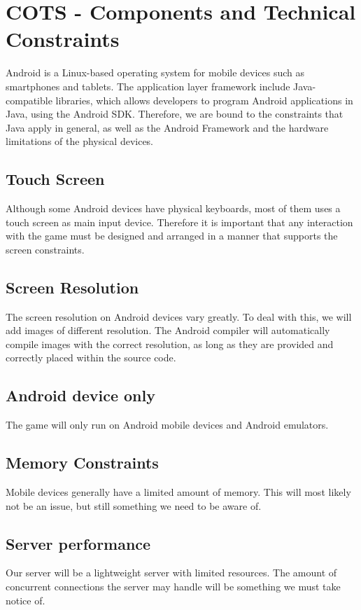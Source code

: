 \section{COTS - Components and Technical Constraints}
\label{sec:COTS}

Android is a Linux-based operating system for mobile devices such as smartphones and tablets. The application layer framework include Java-compatible libraries, which allows developers to program Android applications in Java, using the Android SDK. Therefore, we are bound to the constraints that Java apply in general, as well as the Android Framework and the hardware limitations of the physical devices.

\subsection{Touch Screen}
Although some Android devices have physical keyboards, most of them uses a touch screen as main input device. Therefore it is important that any interaction with the game must be designed and arranged in a manner that supports the screen constraints. 

\subsection{Screen Resolution}
The screen resolution on Android devices vary greatly. To deal with this, we will add images of different resolution. The Android compiler will automatically compile images with the correct resolution, as long as they are provided and correctly placed within the source code.

\subsection{Android device only}
The game will only run on Android mobile devices and Android emulators.

\subsection{Memory Constraints}
Mobile devices generally have a limited amount of memory. This will most likely not be an issue, but still something we need to be aware of.

\subsection{Server performance}
Our server will be a lightweight server with limited resources. The amount of concurrent connections the server may handle will be something we must take notice of.


